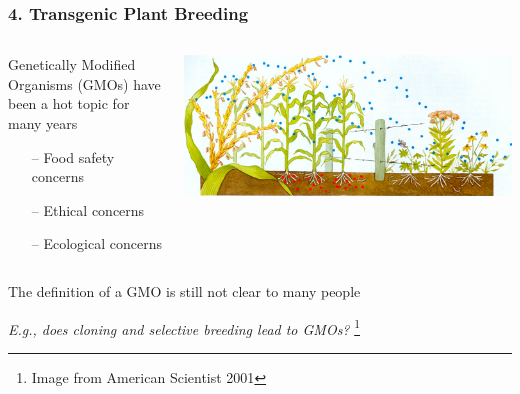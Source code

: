 \documentclass[xcolor=dvipsnames]{beamer}
\newcommand\blfootnote[1]{%
	\begingroup
	\renewcommand\thefootnote{}\footnote{#1}%
	\addtocounter{footnote}{-1}%
	\endgroup
}
\begin{document}
\begin{frame}
	\frametitle{4. Transgenic Plant Breeding }
	\begin{columns}
		\begin{column}{0.5\textwidth}
	Genetically Modified Organisms (GMOs) have been a hot topic for many years
	\begin{itemize}
		\item[--] Food safety concerns 
		\item[--] Ethical concerns
		\item[--] Ecological concerns
	\end{itemize}
	
		\end{column}
		\begin{column}{0.5\textwidth}
	\centering	\includegraphics[keepaspectratio, width  = \textwidth]{img/transgenicPollenFlow}
		\end{column}
	\end{columns}
	
	\vspace{10pt}
	The definition of a GMO is still not clear to many people
	
\textit{		E.g., does cloning and selective breeding lead to GMOs?
}
\blfootnote{Image from American Scientist 2001}
\end{frame}
\end{document}
